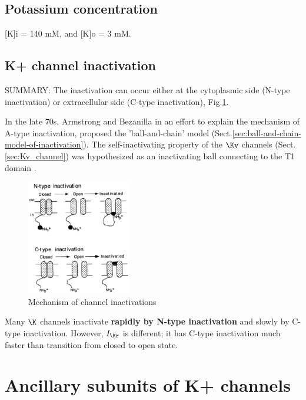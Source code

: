 \subsection{Potassium concentration}
\label{sec:concentration-K+-ion}

[K]i = 140 mM, and [K]o = 3 mM.

\subsection{K+ channel inactivation}
\label{sec:K+-channel-inactivation-mechanism}


SUMMARY: The inactivation can occur either at the cytoplasmic side (N-type
inactivation) or extracellular side (C-type inactivation),
Fig.\ref{fig:Kchannel_inactivation}.

In the late 70s, Armstrong and Bezanilla in an effort to explain the mechanism
of A-type inactivation, proposed the 'ball-and-chain' model
(Sect.\ref{sec:ball-and-chain-model-of-inactivation}).
The self-inactivating property of the $\Kv$ channels (Sect.\ref{sec:Kv_channel})
was hypothesized as an inactivating ball connecting to the T1 domain
\citep{hoshi1990}.

\begin{figure}[hbt]
  \centerline{\includegraphics[height=5cm,
    angle=0]{./images/inactivation_mechanism.eps}}
  \caption{Mechanism of channel inactivations \citep{sanguinetti1997}}
  \label{fig:Kchannel_inactivation}
\end{figure}

Many $\K$ channels inactivate {\bf rapidly by N-type inactivation} and slowly by
C-type inactivation. However, $I_\Kr$ is different; it has C-type inactivation
much faster than transition from closed to open state.

\section{Ancillary subunits of K+ channels}
\label{sec:Kv-ancillary-subunits}

